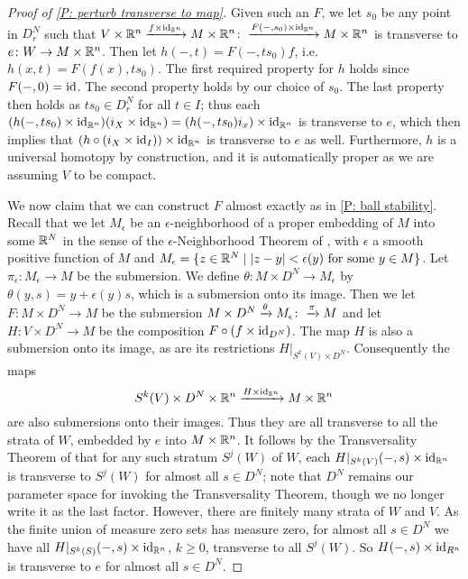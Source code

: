 \begin{proof}[Proof of \cref{P: perturb transverse to map}]
	Given such an $F$, we let $s_0$ be any point in $D_r^N$ such that $V \times \mathbb{R}^n \xrightarrow{f \times \mathrm{id}_{\mathbb{R}^n}} M \times \mathbb{R}^n\colon\xrightarrow{F(-,s_0) \times \mathrm{id}_{\mathbb{R}^n}}M \times \mathbb{R}^n$ is transverse to $e \colon W \to M \times \mathbb{R}^n$.
	Then let $h(-,t) = F(-,ts_0)f$, i.e.\ $h(x,t) = F(f(x),ts_0)$.
	The first required property for $h$ holds since $F(-,0) = \mathrm{id}$.
	The second property holds by our choice of $s_0$.
	The last property then holds as $ts_0 \in D_r^N$ for all $t \in I$; thus each $(h(-,ts_0) \times \mathrm{id}_{\mathbb{R}^n})(i_X \times \mathrm{id}_{\mathbb{R}^n}) = (h(-,ts_0)i_x) \times \mathrm{id}_{\mathbb{R}^n}$ is transverse to $e$, which then implies that $(h\circ(i_{X} \times \mathrm{id}_I)) \times \mathrm{id}_{\mathbb{R}^n}$ is transverse to $e$ as well.
	Furthermore, $h$ is a universal homotopy by construction, and it is automatically proper as we are assuming $V$ to be compact.

	We now claim that we can construct $F$ almost exactly as in \cref{P: ball stability}.
	Recall that we let $M_\epsilon$ be an $\epsilon$-neighborhood of a proper embedding of $M$ into some $\mathbb{R}^N$ in the sense of the $\epsilon$-Neighborhood Theorem of \cite[Section 2.3]{GuPo74}, with $\epsilon$ a smooth positive function of $M$ and $M_\epsilon = \{z \in \mathbb{R}^N \mid |z-y|<\epsilon(y) \text{ for some }y \in M\}$.
	Let $\pi_\epsilon: M_\epsilon \to M$ be the submersion.
	We define $\theta: M \times D^N \to M_\epsilon$ by $\theta(y, s) = y + \epsilon(y) s$, which is a submersion onto its image.
	Then we let $F \colon M \times D^N \to M$ be the submersion $M \times D^N \xrightarrow{\theta}M_\epsilon\colon\xrightarrow{\pi}M$ and let $H \colon V \times D^N \to M$ be the composition $F \circ (f \times \mathrm{id}_{D^N})$.
	The map $H$ is also a submersion onto its image, as are its restrictions $H|_{S^k(V) \times D^N}$.
	Consequently the maps
	$$S^k(V) \times D^N \times \mathbb{R}^n \xrightarrow{H \times \mathrm{id}_{\mathbb{R}^n}} M \times \mathbb{R}^n$$
	are also submersions onto their images.
	Thus they are all transverse to all the strata of $W$, embedded by $e$ into $M \times \mathbb{R}^n$.
	It follows by the Transversality Theorem of \cite[Section 2.3]{GuPo74} that for any such stratum $S^j(W)$ of $W$, each $H|_{S^k(V)}(-,s) \times \mathrm{id}_{\mathbb{R}^n}$ is transverse to $S^j(W)$ for almost all $s \in D^N$; note that $D^N$ remains our parameter space for invoking the Transversality Theorem, though we no longer write it as the last factor.
	However, there are finitely many strata of $W$ and $V$.
	As the finite union of measure zero sets has measure zero, for almost all $s \in D^N$ we have all $H|_{S^k(S)}(-,s) \times \mathrm{id}_{\mathbb{R}^n}$, $k\geq 0$, transverse to all $S^j(W)$.
	So $H(-,s) \times \mathrm{id}_{R^n}$ is transverse to $e$ for almost all $s \in D^N$.


\end{proof}

